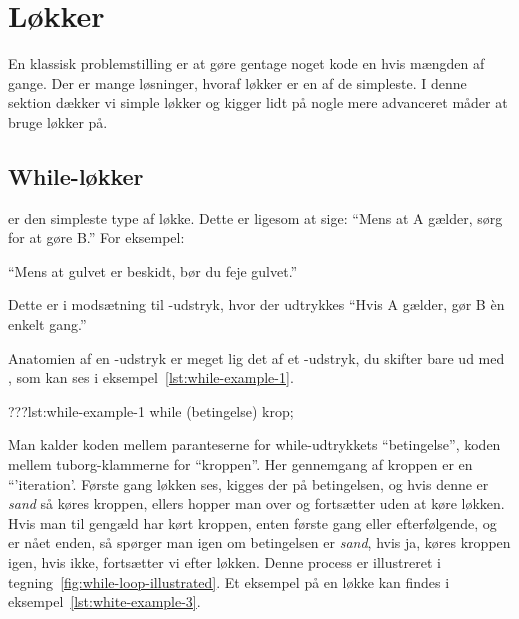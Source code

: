 \section{Løkker}

    En klassisk problemstilling er at gøre gentage noget kode en hvis
    mængden af gange. Der er mange løsninger, hvoraf løkker er en af
    de simpleste. I denne sektion dækker vi simple løkker og kigger
    lidt på nogle mere advanceret måder at bruge løkker på.

	\subsection{While-løkker}

         er den simpleste type af løkke. Dette er ligesom at
		sige: ``Mens at A gælder, sørg for at gøre B.'' For eksempel:

		``Mens at gulvet er beskidt, bør du feje gulvet.''

		Dette er i modsætning til -udstryk, hvor der udtrykkes
		``Hvis A gælder, gør B èn enkelt gang.''

		Anatomien af en -udstryk er meget lig det af et
		-udstryk, du skifter bare  ud med
		, som kan ses i eksempel~\ref{lst:while-example-1}.

		\begin{JavaCode}{???}{lst:while-example-1}
			while (betingelse) {
				krop;
			}
		\end{JavaCode}

        Man kalder koden mellem paranteserne for while-udtrykkets
        ``betingelse'', koden mellem tuborg-klammerne for ``kroppen''.
        Her gennemgang af kroppen er en ``'iteration'.  Første gang
        løkken ses, kigges der på betingelsen, og hvis denne er
        \emph{sand} så køres kroppen, ellers hopper man over og
        fortsætter uden at køre løkken. Hvis man til gengæld har kørt
        kroppen, enten første gang eller efterfølgende, og er nået
        enden, så spørger man igen om betingelsen er \emph{sand}, hvis
        ja, køres kroppen igen, hvis ikke, fortsætter vi efter løkken.
        Denne process er illustreret i
        tegning~\ref{fig:while-loop-illustrated}. Et eksempel på en
        løkke kan findes i eksempel~\ref{lst:white-example-3}.


